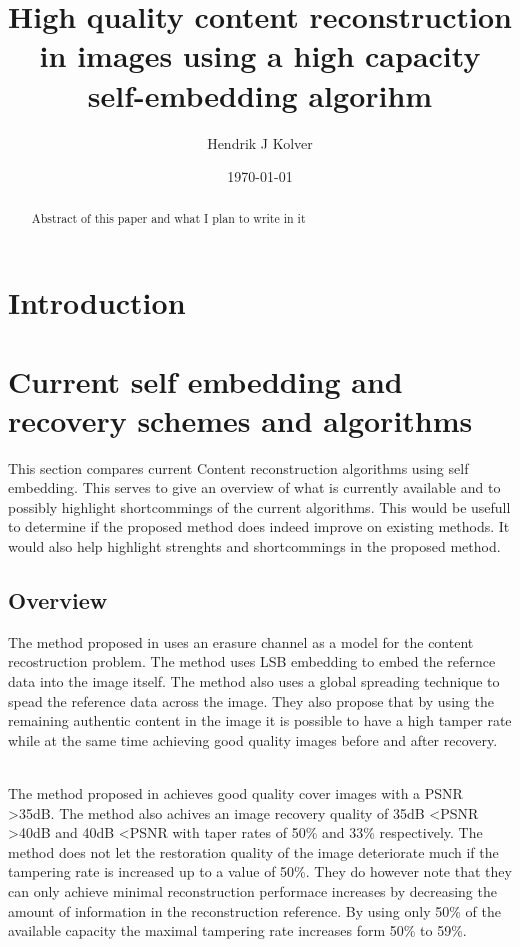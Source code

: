 \documentclass[a4paper]{article}
\title{High quality content reconstruction in images using a high capacity self-embedding algorihm}
\author{Hendrik J Kolver}
\date{\today}
\begin{document}
\maketitle

\begin{abstract}
Abstract of this paper and what I plan to write in it
\end{abstract}

\section{Introduction}

\section{Current self embedding and recovery schemes and algorithms}

This section compares current Content reconstruction algorithms using self embedding.
This serves to give an overview of what is currently available and to possibly highlight shortcommings of the current algorithms.
This would be usefull to determine if the proposed method does indeed improve on existing methods. 
It would also help highlight strenghts and shortcommings in the proposed method.

\subsection{Overview}

The method proposed in \cite {korus2013efficient} uses an erasure channel as a model for the content recostruction problem.
The method uses LSB embedding to embed the refernce data into the image itself.
The method also uses a global spreading technique to spead the reference data across the image.
They also propose that by using the remaining authentic content in the image it is possible to have a high tamper rate while at the same time achieving good quality images before and after recovery.

\hspace{0pt} \\
The method proposed in \cite {korus2013efficient} achieves good quality cover images with a PSNR \textgreater 35dB. 
The method also achives an image recovery quality of 35dB \textless PSNR \textgreater 40dB and 40dB \textless PSNR with taper rates of 50\% and 33\% respectively.
The method does not let the restoration quality of the image deteriorate much if the tampering rate is increased up to a value of 50\%.
They do however note that they can only achieve minimal reconstruction performace increases by decreasing the amount of information in the reconstruction reference.
By using only 50\% of the available capacity the maximal tampering rate increases form 50\% to 59\%.
\end{document}
